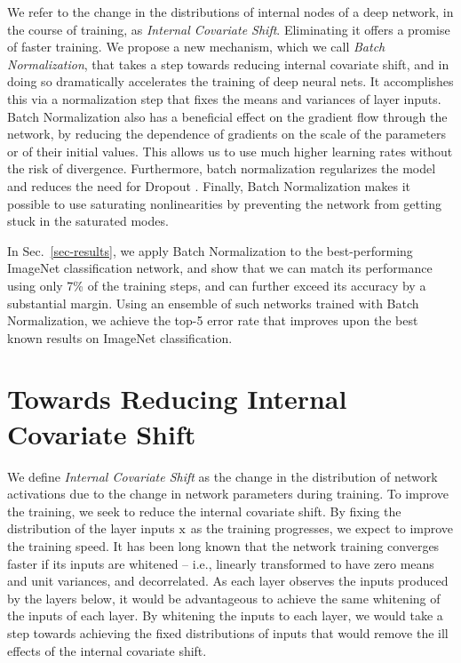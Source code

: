 \documentclass[twocolumn]{article}
\begin{document}
We refer to the change in the distributions of internal nodes of a
deep network, in the course of training, as {\em Internal Covariate Shift}. Eliminating it offers
a promise of faster training.  We propose a new mechanism, which we
call {\em Batch Normalization}, that takes a step towards reducing
internal covariate shift, and in doing so dramatically accelerates the
training of deep neural nets. It accomplishes this via a normalization
step that fixes the means and variances of layer inputs. Batch
Normalization also has a beneficial effect on the gradient flow
through the network, by reducing the dependence of gradients on the
scale of the parameters or of their initial values. This allows us to
use much higher learning rates without the risk of
divergence. Furthermore, batch normalization regularizes the model and
reduces the need for Dropout \cite{dropout}.  Finally, Batch
Normalization makes it possible to use saturating nonlinearities by
preventing the network from getting stuck in the saturated modes.

In Sec.~\ref{sec-results}, we apply Batch Normalization to the
best-performing ImageNet classification network, and show that we can
match its performance using only 7\% of the training steps, and can
further exceed its accuracy by a substantial margin.  Using an
ensemble of such networks trained with Batch Normalization, we achieve
the top-5 error rate that improves upon the best known results on
ImageNet classification.


\section{Towards Reducing Internal \mbox{Covariate} Shift}

We define {\em Internal Covariate Shift} as
the change in the
distribution of network activations due to the change in network parameters during training.  To improve the
training, we seek to reduce the internal covariate shift.  By fixing
the distribution of the layer inputs $\mathrm{x}$ as the training progresses,
we expect to improve the training speed.
It has been long known \cite{lecun-backprop,
  loglinear-training}
that the network training converges faster if its inputs are whitened -- i.e.,
linearly transformed to have zero means and unit variances, and  decorrelated. As each layer
observes the inputs produced by the layers below, it would be advantageous to
achieve the same whitening of the inputs of each layer.  By whitening the
inputs to each layer, we would take a step towards achieving the fixed
distributions of inputs that would remove the ill effects of the internal covariate shift.
\end{document}
